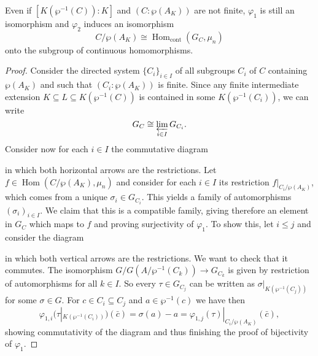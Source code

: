\documentclass[12pt]{amsart}
\DeclareMathOperator{\Hom}{Hom}
\begin{document}
\begin{prop}\label{prop:infinitecase}
    Even if $[K(\wp^{-1}(C)):K]$ and $(C:\wp(A_{K}))$ are not finite, $\varphi_{1}$ is still an isomorphism and $\varphi_{2}$ induces an isomorphism
    \[ C/\wp(A_{K})\cong \Hom_{\mathrm{cont}}(G_{C},\mu_{n}) \]
    onto the subgroup of continuous homomorphisms.
    \begin{proof}
	Consider the directed system $\{ C_{i} \}_{i\in I}$ of all subgroups $C_{i}$ of $C$ containing $\wp(A_{K})$ and such that $(C_{i}:\wp(A_{K}))$ is finite.
	Since any finite intermediate extension $K\subseteq L\subseteq K(\wp^{-1}(C))$ is contained in some $K(\wp^{-1}(C_{i}))$, we can write
	\[ G_{C}\cong \varprojlim_{i\in I} G_{C_{i}}. \]
	Consider now for each $i\in I$ the commutative diagram
	\begin{center}
	\end{center}
	in which both horizontal arrows are the restrictions.
	Let $f\in \Hom(C/\wp(A_{K}),\mu_{n})$ and consider for each $i\in I$ its restriction $f|_{C_{i}/\wp(A_{K})}$, which comes from a unique $\sigma_{i}\in G_{C_{i}}$.
	This yields a family of automorphisms $(\sigma_{i})_{i\in I}$.
	We claim that this is a compatible family, giving therefore an element in $G_{C}$ which maps to $f$ and proving surjectivity of $\varphi_{1}$.
	To show this, let $i\leqslant j$ and consider the diagram
	\begin{center}
	\end{center}
	in which both vertical arrows are the restrictions.
	We want to check that it commutes.
	The isomorphism $G/G(A/\wp^{-1}(C_{k}))\to G_{C_{k}}$ is given by restriction of automorphisms for all $k\in I$.
	So every $\tau\in G_{C_{j}}$ can be written as $\sigma|_{K(\wp^{-1}(C_{j}))}$ for some $\sigma\in G$.
	For $c\in C_{i}\subseteq C_{j}$ and $a\in \wp^{-1}(c)$ we have then
	\[ \varphi_{1,i}(\tau|_{K(\wp^{-1}(C_{i}))})(\bar{c})=\sigma(a)-a=\varphi_{1,j}(\tau)|_{C_{i}/\wp(A_{K})}(\bar{c}), \]
	showing commutativity of the diagram and thus finishing the proof of bijectivity of $\varphi_{1}$.


\end{proof}
\end{prop}
\end{document}
